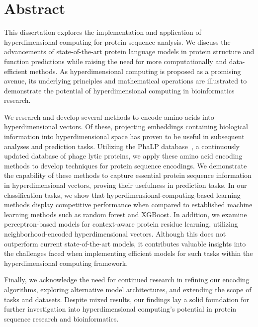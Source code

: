 \chapter{Abstract}
This dissertation explores the implementation and application of hyperdimensional computing for protein sequence analysis. We discuss the advancements of state-of-the-art protein language models in protein structure and function predictions while raising the need for more computationally and data-efficient methods. As hyperdimensional computing is proposed as a promising avenue, its underlying principles and mathematical operations are illustrated to demonstrate the potential of hyperdimensional computing in bioinformatics research. 

We research and develop several methods to encode amino acids into hyperdimensional vectors. Of these, projecting embeddings containing biological information into hyperdimensional space has proven to be useful in subsequent analyses and prediction tasks. Utilizing the PhaLP database~\cite{phalp}, a continuously updated database of phage lytic proteins, we apply these amino acid encoding methods to develop techniques for protein sequence encodings. We demonstrate the capability of these methods to capture essential protein sequence information in hyperdimensional vectors, proving their usefulness in prediction tasks. In our classification tasks, we show that hyperdimensional-computing-based learning methods display competitive performance when compared to established machine learning methods such as random forest and XGBoost. In addition, we examine perceptron-based models for context-aware protein residue learning, utilizing neighborhood-encoded hyperdimensional vectors. Although this does not outperform current state-of-the-art models, it contributes valuable insights into the challenges faced when implementing efficient models for such tasks within the hyperdimensional computing framework. 

Finally, we acknowledge the need for continued research in refining our encoding algorithms, exploring alternative model architectures, and extending the scope of tasks and datasets. Despite mixed results, our findings lay a solid foundation for further investigation into hyperdimensional computing's potential in protein sequence research and bioinformatics.